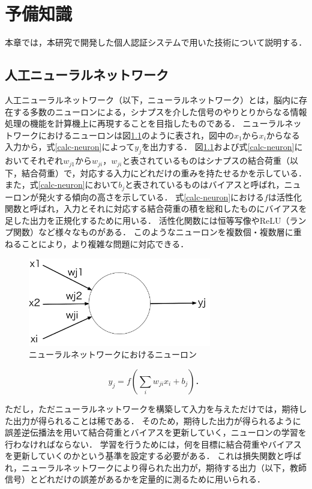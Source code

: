 \chapter{予備知識}
本章では，本研究で開発した個人認証システムで用いた技術について説明する．

\section{人工ニューラルネットワーク}
人工ニューラルネットワーク（以下，ニューラルネットワーク）とは，脳内に存在する多数のニューロンによる，シナプスを介した信号のやりとりからなる情報処理の機能を計算機上に再現することを目指したものである．
ニューラルネットワークにおけるニューロンは図\ref{neuron}のように表され，図中の$x_1$から$x_i$からなる入力から，式\ref{calc-neuron}によって$y_j$を出力する．
図\ref{neuron}および式\ref{calc-neuron}においてそれぞれ$w_{j1}$から$w_{ji}$，$w_{ji}$と表されているものはシナプスの結合荷重（以下，結合荷重）で，対応する入力にどれだけの重みを持たせるかを示している．
また，式\ref{calc-neuron}において$b_j$と表されているものはバイアスと呼ばれ，ニューロンが発火する傾向の高さを示している．
式\ref{calc-neuron}における$f$は活性化関数と呼ばれ，入力とそれに対応する結合荷重の積を総和したものにバイアスを足した出力を正規化するために用いる．
活性化関数には恒等写像やReLU（ランプ関数）など様々なものがある．
このようなニューロンを複数個・複数層に重ねることにより，より複雑な問題に対応できる．

\begin{figure}[hbtp]
  \centering
  \includegraphics[bb=0 0 683 330, width=8cm]{Figures/neuron.pdf}
  \caption{ニューラルネットワークにおけるニューロン}
  \label{neuron}
\end{figure}

\begin{equation}
\label{calc-neuron}
y_j = f(\sum_i w_{ji} x_i + b_j)．
\end{equation}

ただし，ただニューラルネットワークを構築して入力を与えただけでは，期待した出力が得られることは稀である．
そのため，期待した出力が得られるように誤差逆伝播法を用いて結合荷重とバイアスを更新していく，ニューロンの学習を行わなければならない．
学習を行うためには，何を目標に結合荷重やバイアスを更新していくのかという基準を設定する必要がある．
これは損失関数と呼ばれ，ニューラルネットワークにより得られた出力が，期待する出力（以下，教師信号）とどれだけの誤差があるかを定量的に測るために用いられる．

